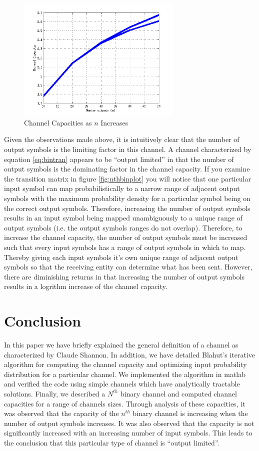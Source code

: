 \documentclass[journal]{IEEEtran}
\begin{document}
\begin{figure}[h]
\centering
\includegraphics[width=3.1in]{../images/graph.png}
\caption{Channel Capacities as \(n\) Increases}
\label{fig:graph}
\end{figure}

\par Given the observations made above, it is intuitively clear that the number of output symbols is the limiting factor in this channel. A channel characterized by equation \ref{eq:bintran} appears to be ``output limited'' in that the number of output symbols is the dominating factor in the channel capacity. If you examine the transition matrix in figure \ref{fig:nthbinplot} you will notice that one particular input symbol can map probabilistically to a narrow range of adjacent output symbols with the maximum probability density for a particular symbol being on the correct output symbols. Therefore, increasing the number of output symbols results in an input symbol being mapped unambiguously to a unique range of output symbols (i.e. the output symbols ranges do not overlap). Therefore, to increase the channel capacity, the number of output symbols must be increased such that every input symbols has a range of output symbols in which to map. Thereby giving each input symbols it's own unique range of adjacent output symbols so that the receiving entity can determine what has been sent. However, there are diminishing returns in that increasing the number of output symbols results in a logrithm increase of the channel capacity.

\section{Conclusion}
\par In this paper we have briefly explained the general definition of a channel as characterized by Claude Shannon. In addition, we have detailed Blahut's iterative algorithm for computing the channel capacity and optimizing input probability distribution for a particular channel. We implemented the algorithm in matlab and verified the code using simple channels which have analytically tractable solutions. Finally, we described a \(N^{th}\) binary channel and computed channel capacities for a range of channels sizes. Through analysis of these capacities, it was observed that the capacity of the \(n^{th}\) binary channel is increasing when the number of output symbols increases. It was also observed that the capacity is not significantly increased with an increasing number of input symbols. This leads to the conclusion that this particular type of channel is ``output limited''.
\end{document}
